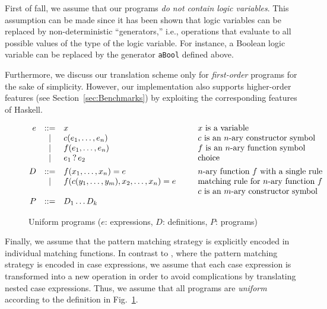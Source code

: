 \documentclass{llncs}
\newcommand{\code}[1]{\mbox{\small\texttt{#1}}}
\newcommand{\Choice}[2]{#1 \mathop{?} #2}
\begin{document}
\label{sec:no-logic-vars}
First of fall, we assume that our programs
\emph{do not contain logic variables}.
This assumption can be made since it has been shown
\cite{AntoyHanus06ICLP} that logic variables can be replaced
by non-deterministic ``generators,''
i.e., operations that evaluate to all possible values of the type of
the logic variable. For instance, a Boolean logic variable
can be replaced by the generator \code{aBool} defined above.

Furthermore, we discuss our translation scheme only for \emph{first-order}
programs for the sake of simplicity.
However, our implementation also supports higher-order features
(see Section~\ref{sec:Benchmarks}) by exploiting the corresponding
features of Haskell.

\begin{figure}[t]
\[
\begin{array}{@{}rcl@{~~~~~~~~}l}
  e & ::= & x & \mbox{$x$ is a variable}\\
    &  |  & c(e_1,\ldots,e_n) & \mbox{$c$ is an $n$-ary constructor symbol}\\
    &  |  & f(e_1,\ldots,e_n) & \mbox{$f$ is an $n$-ary function symbol}\\
    &  |  & \Choice{e_1}{e_2} & \mbox{choice} \\[1ex]
  D & ::= & f(x_1,\ldots,x_n) = e
                & \mbox{$n$-ary function $f$ with a single rule}\\
    &  |  & f(c(y_1,\ldots,y_m),x_2,\ldots,x_n) = e
                & \mbox{matching rule for $n$-ary function $f$}\\
    &     & & \mbox{$c$ is an $m$-ary constructor symbol}\\
  P & ::= & D_1 \ldots D_k
\end{array}
\]
\caption{Uniform programs ($e$: expressions, $D$: definitions, $P$: programs)}
\label{fig:uniform}
\end{figure}
%
Finally, we assume that the pattern matching strategy
is explicitly encoded in individual matching functions.
In contrast to \cite{AlbertHanusHuchOliverVidal05},
where the pattern matching strategy is encoded in case expressions,
we assume that each case expression is transformed into
a new operation in order to avoid complications by translating
nested case expressions.
Thus, we assume that all programs are \emph{uniform}
according to the definition in Fig.~\ref{fig:uniform}.
\end{document}
